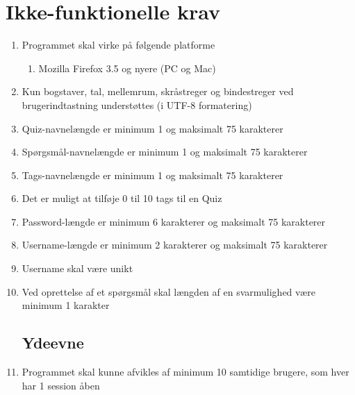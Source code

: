 \section{Ikke-funktionelle krav}
\label{sec:nonFunctional}
\begin{enumerate}
	\subsection*{Brugbarhed}
	\item Programmet skal virke på følgende platforme
	\begin{enumerate}
		\item Mozilla Firefox 3.5 og nyere (PC og Mac)
	\end{enumerate}
	
	\item Kun bogstaver, tal, mellemrum, skråstreger og bindestreger ved brugerindtastning understøttes (i UTF-8 formatering)
	\item Quiz-navnelængde er minimum 1 og maksimalt 75 karakterer
	\item Spørgsmål-navnelængde er minimum 1 og maksimalt 75 karakterer
	\item Tags-navnelængde er minimum 1 og maksimalt 75 karakterer 
	\item Det er muligt at tilføje 0 til 10 tags til en Quiz
	\item Password-længde er minimum 6 karakterer og maksimalt 75 karakterer
	\item Username-længde er minimum 2 karakterer og maksimalt 75 karakterer
	\item Username skal være unikt
	\item Ved oprettelse af et spørgsmål skal længden af en svarmulighed være minimum 1 karakter 
	\subsection*{Ydeevne}
	\item Programmet skal kunne afvikles af minimum 10 samtidige brugere, som hver har 1 session åben
\end{enumerate}